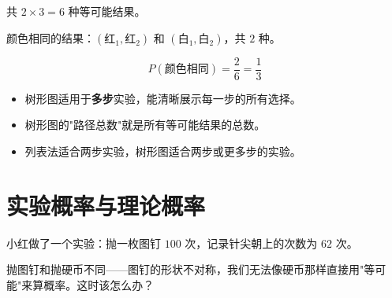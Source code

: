 \begin{workedexamples}
共 $2 \times 3 = 6$ 种等可能结果。

颜色相同的结果：$(红_1,红_2)$ 和 $(白_1,白_2)$，共 $2$ 种。

\[
P(\text{颜色相同}) = \frac{2}{6} = \frac{1}{3}
\]


\end{workedexamples}

\begin{keytakeaway}


\begin{itemize}
  \item 树形图适用于\textbf{多步}实验，能清晰展示每一步的所有选择。
  \item 树形图的"路径总数"就是所有等可能结果的总数。
  \item 列表法适合两步实验，树形图适合两步或更多步的实验。
\end{itemize}


\end{keytakeaway}



\section*{实验概率与理论概率}


\begin{explore}


小红做了一个实验：抛一枚图钉 $100$ 次，记录针尖朝上的次数为 $62$ 次。

抛图钉和抛硬币不同——图钉的形状不对称，我们无法像硬币那样直接用"等可能"来算概率。这时该怎么办？

\end{explore}

